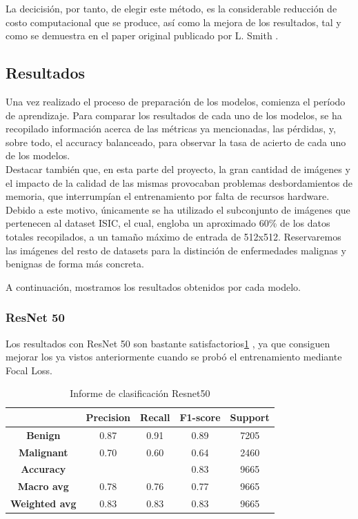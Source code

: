La decicisión, por tanto, de elegir este método, es la considerable reducción de costo computacional que se produce, así como la mejora de los resultados, tal y como se demuestra en el paper original publicado por L. Smith \cite{smith2018disciplined}. 

\subsection{Resultados}

Una vez realizado el proceso de preparación de los modelos, comienza el período de aprendizaje. Para comparar los resultados de cada uno de los modelos, se ha recopilado información acerca de las métricas ya mencionadas, las pérdidas, y, sobre todo, el accuracy balanceado, para observar la tasa de acierto de cada uno de los modelos.\\

Destacar también que, en esta parte del proyecto, la gran cantidad de imágenes y el impacto de la calidad de las mismas provocaban problemas desbordamientos de memoria, que interrumpían el entrenamiento por falta de recursos hardware. Debido a este motivo, únicamente se ha utilizado el subconjunto de imágenes que pertenecen al dataset ISIC, el cual, engloba un aproximado 60\% de los datos totales recopilados, a un tamaño máximo de entrada de 512x512. Reservaremos las imágenes del resto de datasets para la distinción de enfermedades malignas y benignas de forma más concreta.

A continuación, mostramos los resultados obtenidos por cada modelo.

\subsubsection{ResNet 50}

Los resultados con ResNet 50 son bastante satisfactorios\ref{tab:resultsbinrn50} , ya que consiguen mejorar los ya vistos anteriormente cuando se probó el entrenamiento mediante Focal Loss.

\begin{table}[!ht]
	\centering
	\begin{tabular}{|c|c|c|c|c|}
		\hline
		\textbf{} & \textbf{Precision} & \textbf{Recall} & \textbf{F1-score} & \textbf{Support} \\ \hline
		\textbf{Benign} & 0.87 & 0.91 & 0.89 & 7205 \\ \hline
		\textbf{Malignant} & 0.70 & 0.60 & 0.64 & 2460 \\ \hline
		\textbf{Accuracy} & ~ & ~ & 0.83 & 9665 \\ \hline
		\textbf{Macro avg} & 0.78 & 0.76 & 0.77 & 9665 \\ \hline
		\textbf{Weighted avg} & 0.83 & 0.83 & 0.83 & 9665 \\ \hline
	\end{tabular}
	\caption{Informe de clasificación Resnet50}
	\label{tab:resultsbinrn50}
\end{table}


